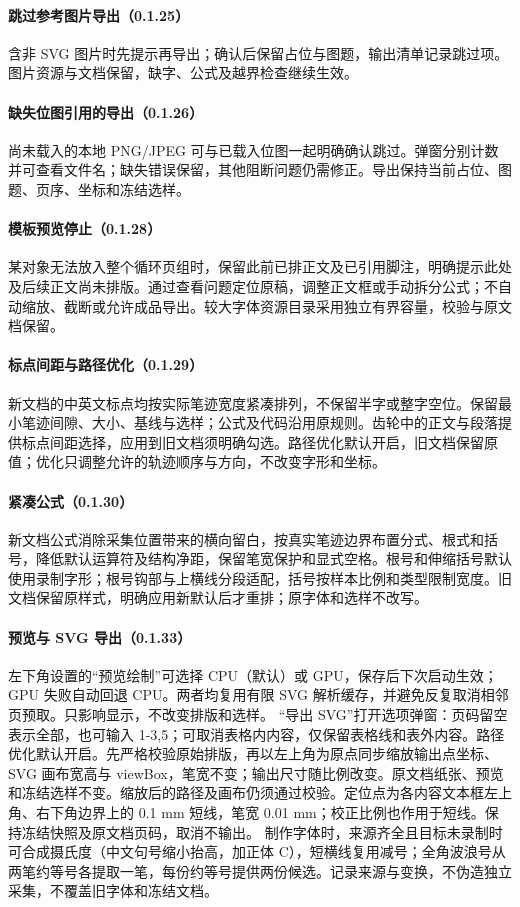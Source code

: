\paragraph{跳过参考图片导出（0.1.25）}含非 SVG 图片时先提示再导出；确认后保留占位与图题，输出清单记录跳过项。图片资源与文档保留，缺字、公式及越界检查继续生效。

\paragraph{缺失位图引用的导出（0.1.26）}尚未载入的本地 PNG/JPEG 可与已载入位图一起明确确认跳过。弹窗分别计数并可查看文件名；缺失错误保留，其他阻断问题仍需修正。导出保持当前占位、图题、页序、坐标和冻结选样。

\paragraph{模板预览停止（0.1.28）}某对象无法放入整个循环页组时，保留此前已排正文及已引用脚注，明确提示此处及后续正文尚未排版。通过查看问题定位原稿，调整正文框或手动拆分公式；不自动缩放、截断或允许成品导出。较大字体资源目录采用独立有界容量，校验与原文档保留。

\paragraph{标点间距与路径优化（0.1.29）}新文档的中英文标点均按实际笔迹宽度紧凑排列，不保留半字或整字空位。保留最小笔迹间隙、大小、基线与选样；公式及代码沿用原规则。齿轮中的正文与段落提供标点间距选择，应用到旧文档须明确勾选。路径优化默认开启，旧文档保留原值；优化只调整允许的轨迹顺序与方向，不改变字形和坐标。

\paragraph{紧凑公式（0.1.30）}新文档公式消除采集位置带来的横向留白，按真实笔迹边界布置分式、根式和括号，降低默认运算符及结构净距，保留笔宽保护和显式空格。根号和伸缩括号默认使用录制字形；根号钩部与上横线分段适配，括号按样本比例和类型限制宽度。旧文档保留原样式，明确应用新默认后才重排；原字体和选样不改写。

\paragraph{预览与 SVG 导出（0.1.33）}左下角设置的“预览绘制”可选择 CPU（默认）或 GPU，保存后下次启动生效；GPU 失败自动回退 CPU。两者均复用有限 SVG 解析缓存，并避免反复取消相邻页预取。只影响显示，不改变排版和选样。
“导出 SVG”打开选项弹窗：页码留空表示全部，也可输入 1-3,5；可取消表格内内容，仅保留表格线和表外内容。路径优化默认开启。先严格校验原始排版，再以左上角为原点同步缩放输出点坐标、SVG 画布宽高与 viewBox，笔宽不变；输出尺寸随比例改变。原文档纸张、预览和冻结选样不变。缩放后的路径及画布仍须通过校验。定位点为各内容文本框左上角、右下角边界上的 0.1 mm 短线，笔宽 0.01 mm；校正比例也作用于短线。保持冻结快照及原文档页码，取消不输出。
制作字体时，来源齐全且目标未录制时可合成摄氏度（中文句号缩小抬高，加正体 C），短横线复用减号；全角波浪号从两笔约等号各提取一笔，每份约等号提供两份候选。记录来源与变换，不伪造独立采集，不覆盖旧字体和冻结文档。

